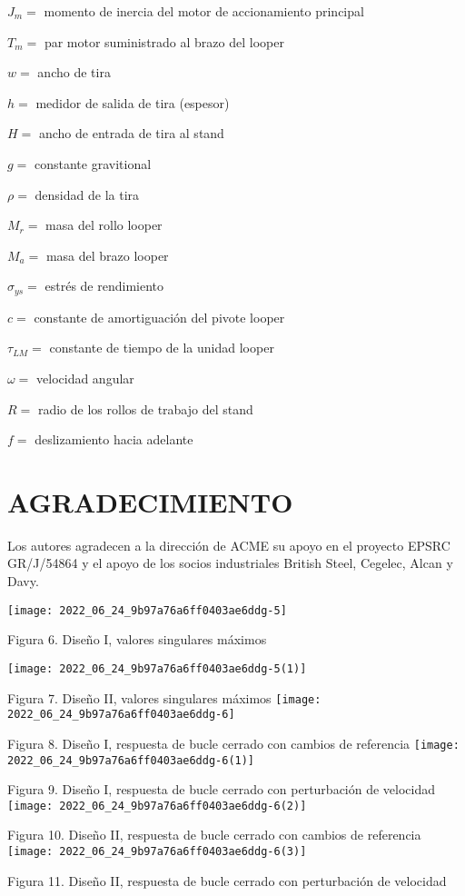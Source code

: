 $J_{m}=$ momento de inercia del motor de accionamiento principal

$T_{m}=$ par motor suministrado al brazo del looper

$w=$ ancho de tira

$h=$ medidor de salida de tira (espesor)

$H=$ ancho de entrada de tira al stand

$g=$ constante gravitional

$\rho=$ densidad de la tira

$M_{r}=$ masa del rollo looper

$M_{a}=$ masa del brazo looper

$\sigma_{y s}=$ estrés de rendimiento

$c=$ constante de amortiguación del pivote looper

$\tau_{L M}=$ constante de tiempo de la unidad looper

$\omega=$ velocidad angular

$R=$ radio de los rollos de trabajo del stand

$f=$ deslizamiento hacia adelante

\section{AGRADECIMIENTO}
Los autores agradecen a la dirección de ACME su apoyo en el proyecto EPSRC GR/J/54864 y el apoyo de los socios industriales British Steel, Cegelec, Alcan y Davy.

\begin{center}
\texttt{[image: 2022\_06\_24\_9b97a76a6ff0403ae6ddg-5]}
\end{center}

Figura 6. Diseño I, valores singulares máximos

\begin{center}
\texttt{[image: 2022\_06\_24\_9b97a76a6ff0403ae6ddg-5(1)]}
\end{center}

Figura 7. Diseño II, valores singulares máximos
\texttt{[image: 2022\_06\_24\_9b97a76a6ff0403ae6ddg-6]}

Figura 8. Diseño I, respuesta de bucle cerrado con cambios de referencia
\texttt{[image: 2022\_06\_24\_9b97a76a6ff0403ae6ddg-6(1)]}

Figura 9. Diseño I, respuesta de bucle cerrado con perturbación de velocidad
\texttt{[image: 2022\_06\_24\_9b97a76a6ff0403ae6ddg-6(2)]}

Figura 10. Diseño II, respuesta de bucle cerrado con cambios de referencia
\texttt{[image: 2022\_06\_24\_9b97a76a6ff0403ae6ddg-6(3)]}

Figura 11. Diseño II, respuesta de bucle cerrado con perturbación de velocidad


%